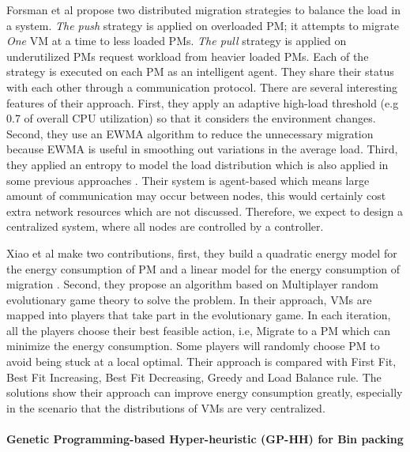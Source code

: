 Forsman et al \cite{Forsman:2015ca} propose two distributed migration strategies to balance the load in a system. \emph{The push} strategy is applied on overloaded PM; it attempts to migrate \emph{One} VM at a time to less loaded PMs. \emph{The pull} strategy is applied on underutilized PMs request workload from heavier loaded PMs. Each of the strategy is executed on each PM as an intelligent agent. They share their status with each other through a communication protocol. There are several interesting features of their approach. First, they apply an adaptive high-load threshold (e.g 0.7 of overall CPU utilization) so that it considers the environment changes. Second, they use an EWMA algorithm to reduce the unnecessary migration because EWMA \cite{Holt:2004fs} is useful in smoothing out variations in the average load. Third, they applied an entropy to model the load distribution which is also applied in some previous approaches \cite{Qin:2012wu,Kunkle:2008bz}. Their system is agent-based which means large amount of communication may occur between nodes, this would certainly cost extra network resources which are not discussed. Therefore, we expect to design a centralized system, where all nodes are controlled by a controller. 

Xiao et al \cite{Xiao:2015ik} make two contributions, first, they build a quadratic energy model for the energy consumption of PM and a linear model for the energy consumption of migration \cite{Liu:2013kl}. Second, they propose an algorithm based on Multiplayer random evolutionary game theory to solve the problem. In their approach, VMs are mapped into players that take part in the evolutionary game. In each iteration, all the players choose their best feasible action, i.e, Migrate to a PM which can minimize the energy consumption. Some players will randomly choose PM to avoid being stuck at a local optimal. Their approach is compared with First Fit, Best Fit Increasing, Best Fit Decreasing, Greedy and Load Balance rule. The solutions show their approach can improve energy consumption greatly, especially in the scenario that the distributions of VMs are very centralized.

\paragraph{Genetic Programming-based Hyper-heuristic (GP-HH) for Bin packing}

